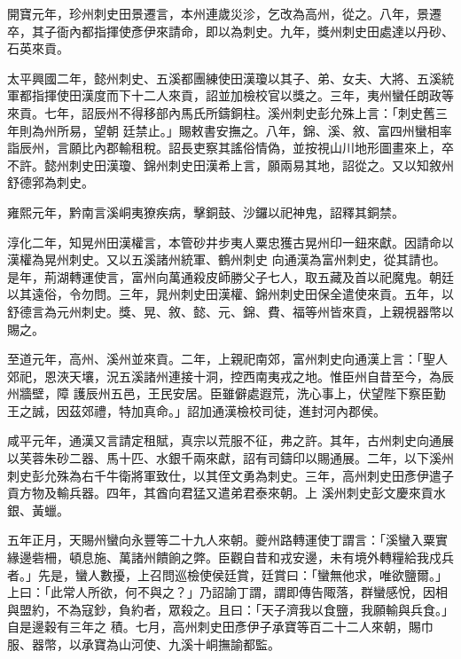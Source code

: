 \begin{pinyinscope}
 開寶元年，珍州刺史田景遷言，本州連歲災沴，乞改為高州，從之。八年，景遷卒，其子衙內都指揮使彥伊來請命，即以為刺史。九年，獎州刺史田處達以丹砂、石英來貢。



 太平興國二年，懿州刺史、五溪都團練使田漢瓊以其子、弟、女夫、大將、五溪統軍都指揮使田漢度而下十二人來貢，詔並加檢校官以獎之。三年，夷州蠻任朗政等來貢。七年，詔辰州不得移部內馬氏所鑄銅柱。溪州刺史彭允殊上言：「刺史舊三年則為州所易，望朝
 廷禁止。」賜敕書安撫之。八年，錦、溪、敘、富四州蠻相率詣辰州，言願比內郡輸租稅。詔長吏察其謠俗情偽，並按視山川地形圖畫來上，卒不許。懿州刺史田漢瓊、錦州刺史田漢希上言，願兩易其地，詔從之。又以知敘州舒德郛為刺史。



 雍熙元年，黔南言溪峒夷獠疾病，擊銅鼓、沙鑼以祀神鬼，詔釋其銅禁。



 淳化二年，知晃州田漢權言，本管砂井步夷人粟忠獲古晃州印一鈕來獻。因請命以漢權為晃州刺史。又以五溪諸州統軍、鶴州刺史
 向通漢為富州刺史，從其請也。是年，荊湖轉運使言，富州向萬通殺皮師勝父子七人，取五藏及首以祀魔鬼。朝廷以其遠俗，令勿問。三年，晁州刺史田漢權、錦州刺史田保全遣使來貢。五年，以舒德言為元州刺史。獎、晃、敘、懿、元、錦、費、福等州皆來貢，上親視器幣以賜之。



 至道元年，高州、溪州並來貢。二年，上親祀南郊，富州刺史向通漢上言：「聖人郊祀，恩浹天壤，況五溪諸州連接十洞，控西南夷戎之地。惟臣州自昔至今，為辰州牆壁，障
 護辰州五邑，王民安居。臣雖僻處遐荒，洗心事上，伏望陛下察臣勤王之誠，因茲郊禮，特加真命。」詔加通漢檢校司徒，進封河內郡侯。



 咸平元年，通漢又言請定租賦，真宗以荒服不征，弗之許。其年，古州刺史向通展以芙蓉朱砂二器、馬十匹、水銀千兩來獻，詔有司鑄印以賜通展。二年，以下溪州刺史彭允殊為右千牛衛將軍致仕，以其侄文勇為刺史。三年，高州刺史田彥伊遣子貢方物及輸兵器。四年，其酋向君猛又遣弟君泰來朝。上
 溪州刺史彭文慶來貢水銀、黃蠟。



 五年正月，天賜州蠻向永豐等二十九人來朝。夔州路轉運使丁謂言：「溪蠻入粟實緣邊砦柵，頓息施、萬諸州饋餉之弊。臣觀自昔和戎安邊，未有境外轉糧給我戍兵者。」先是，蠻人數擾，上召問巡檢使侯廷賞，廷賞曰：「蠻無他求，唯欲鹽爾。」上曰：「此常人所欲，何不與之？」乃詔諭丁謂，謂即傳告陬落，群蠻感悅，因相與盟約，不為寇鈔，負約者，眾殺之。且曰：「天子濟我以食鹽，我願輸與兵食。」 自是邊穀有三年之
 積。七月，高州刺史田彥伊子承寶等百二十二人來朝，賜巾服、器幣，以承寶為山河使、九溪十峒撫諭都監。




\end{pinyinscope}
